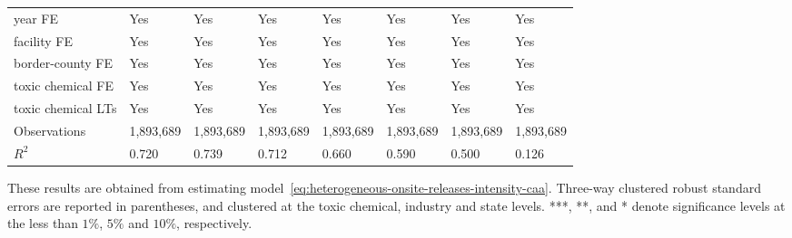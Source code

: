 \begin{table}[H]
{\begin{tabular}{@{}llllllll@{}}
            year FE                         & Yes       & Yes           & Yes       & Yes          & Yes             & Yes           & Yes                 \\
            facility FE                     & Yes       & Yes           & Yes       & Yes          & Yes             & Yes           & Yes                 \\
            border-county FE                & Yes       & Yes           & Yes       & Yes          & Yes             & Yes           & Yes                 \\
            toxic chemical FE               & Yes       & Yes           & Yes       & Yes          & Yes             & Yes           & Yes                 \\
            toxic chemical LTs              & Yes       & Yes           & Yes       & Yes          & Yes             & Yes           & Yes                 \\\midrule
            Observations                    & 1,893,689 & 1,893,689     & 1,893,689 & 1,893,689    & 1,893,689       & 1,893,689     & 1,893,689           \\
            $R^2$                           & 0.720     & 0.739         & 0.712     & 0.660        & 0.590           & 0.500         & 0.126               \\ \bottomrule\bottomrule
        \end{tabular}%
    }
    \begin{minipage}{18cm}
        \vspace{0.05in}
        These results are obtained from estimating model~\ref{eq:heterogeneous-onsite-releases-intensity-caa}. Three-way clustered robust standard errors are reported in parentheses, and clustered at the toxic chemical, industry and state levels. ***, **, and * denote significance levels at the less than $1\%$, $5\%$ and $10\%$, respectively.
    \end{minipage}
\end{table}